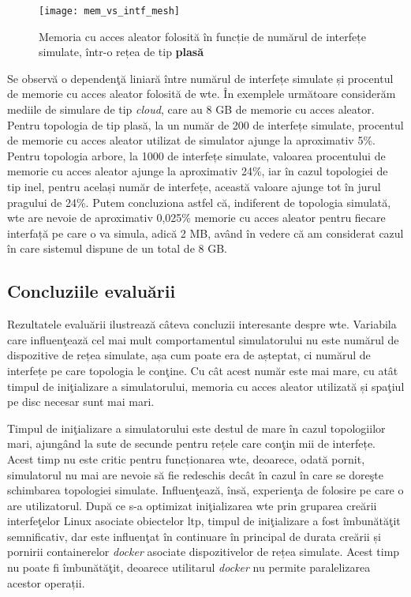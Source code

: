 \begin{figure}[hp]
	\centering
	\texttt{[image: mem\_vs\_intf\_mesh]}
	\caption{Memoria cu acces aleator folosită în funcție de numărul de interfețe simulate, într-o rețea de tip \textbf{plasă}}
	\label{fig:mem_vs_intf_mesh}
\end{figure}

Se observă o dependenţă liniară între numărul de interfețe simulate și procentul de memorie cu acces aleator folosită de \gls{wte}. În exemplele următoare considerăm mediile de simulare de tip \textit{cloud}, care au 8 GB de memorie cu acces aleator. Pentru topologia de tip plasă, la un număr de 200 de interfețe simulate, procentul de memorie cu acces aleator utilizat de simulator ajunge la aproximativ 5\%. Pentru topologia arbore, la 1000 de interfețe simulate, valoarea procentului de memorie cu acces aleator ajunge la aproximativ 24\%, iar în cazul topologiei de tip inel, pentru același număr de interfețe, această valoare ajunge tot în jurul pragului de 24\%. Putem concluziona astfel că, indiferent de topologia simulată, \gls{wte} are nevoie de aproximativ 0,025\% memorie cu acces aleator pentru fiecare interfață pe care o va simula, adică 2 MB, având în vedere că am considerat cazul în care sistemul dispune de un total de 8 GB.

\subsection{Concluziile evaluării}

Rezultatele evaluării ilustrează câteva concluzii interesante despre \gls{wte}. Variabila care influenţează cel mai mult comportamentul simulatorului nu este numărul de dispozitive de rețea simulate, așa cum poate era de așteptat, ci numărul de interfețe pe care topologia le conţine. Cu cât acest număr este mai mare, cu atât timpul de iniţializare a simulatorului, memoria cu acces aleator utilizată și spaţiul pe disc necesar sunt mai mari.

Timpul de iniţializare a simulatorului este destul de mare în cazul topologiilor mari, ajungând la sute de secunde pentru rețele care conţin mii de interfețe. Acest timp nu este critic pentru funcționarea \gls{wte}, deoarece, odată pornit, simulatorul nu mai are nevoie să fie redeschis decât în cazul în care se doreşte schimbarea topologiei simulate. Influenţează, însă, experienţa de folosire pe care o are utilizatorul. După ce s-a optimizat iniţializarea \gls{wte} prin gruparea creării interfeţelor Linux asociate obiectelor \gls{ltp}, timpul de iniţializare a fost îmbunătăţit semnificativ, dar este influenţat în continuare în principal de durata creării și pornirii containerelor \textit{docker} asociate dispozitivelor de rețea simulate. Acest timp nu poate fi îmbunătăţit, deoarece utilitarul \textit{docker} nu permite paralelizarea acestor operații.

